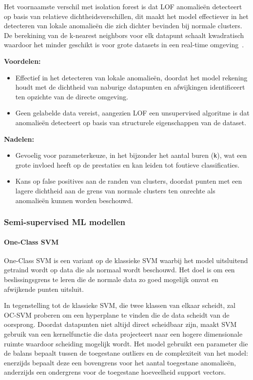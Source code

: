 Het voornaamste verschil met isolation forest is dat LOF anomalieën detecteert op basis van relatieve dichtheidsverschillen, dit maakt het model effectiever in het detecteren van lokale anomalieën die zich dichter bevinden bij normale clusters. 
De berekining van de k-nearest neighbors voor elk datapunt schaalt kwadratisch waardoor het minder geschikt is voor grote datasets in een real-time omgeving~\autocite{Breunig2000}. 

\textbf{Voordelen:}
\begin{itemize}
    \item Effectief in het detecteren van lokale anomalieën, doordat het model
    rekening houdt met de dichtheid van naburige datapunten en afwijkingen
    identificeert ten opzichte van de directe omgeving.
    \item Geen gelabelde data vereist, aangezien LOF een unsupervised algoritme
    is dat anomalieën detecteert op basis van structurele eigenschappen van de
    dataset.
\end{itemize}

\textbf{Nadelen:}
\begin{itemize}
    \item Gevoelig voor parameterkeuze, in het bijzonder het aantal buren
    (\texttt{k}), wat een grote invloed heeft op de prestaties en kan leiden
    tot foutieve classificaties.
    \item Kans op false positives aan de randen van clusters, doordat punten
    met een lagere dichtheid aan de grens van normale clusters ten onrechte als
    anomalieën kunnen worden beschouwd.
\end{itemize}

\medskip

\subsubsection{Semi-supervised ML modellen}

\paragraph{One-Class SVM}

One-Class SVM is een variant op de klassieke SVM waarbij het model uitsluitend
getraind wordt op data die als normaal wordt beschouwd. Het doel is om een
beslissingsgrens te leren die de normale data zo goed mogelijk omvat en
afwijkende punten uitsluit.

In tegenstelling tot de klassieke SVM, die twee klassen van elkaar scheidt, zal OC-SVM proberen om een hyperplane te vinden die de data scheidt van de oorsprong.
Doordat datapunten niet altijd direct scheidbaar zijn, maakt SVM gebruik van een kernelfunctie die data projecteert naar een hogere dimensionale ruimte waardoor scheiding mogelijk wordt. 
Het model gebruikt een parameter die de balans bepaalt tussen de toegestane outliers en de complexiteit van het model: enerzijds bepaalt deze een bovengrens voor het aantal toegestane anomalieën, anderzijds een ondergrens voor de toegestane hoeveelheid support vectors\autocite{Hejazi2013}.

